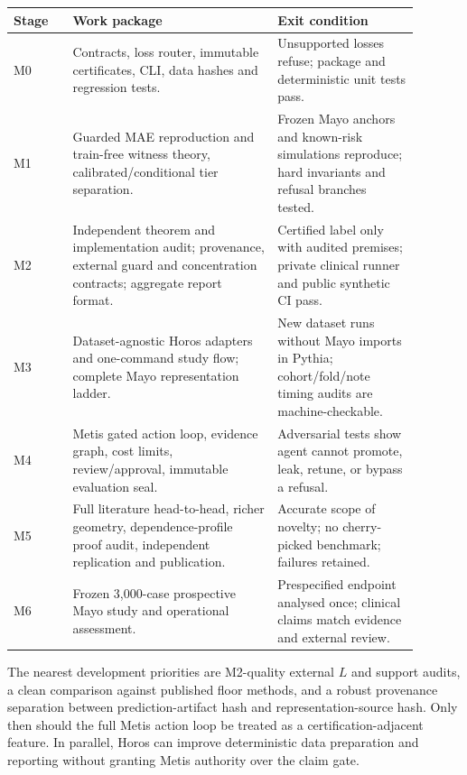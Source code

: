 \documentclass[11pt]{article}
\begin{document}
\begin{longtable}{p{0.13\linewidth}p{0.45\linewidth}p{0.31\linewidth}}
\toprule
Stage & Work package & Exit condition\\\midrule\endhead
M0 & Contracts, loss router, immutable certificates, CLI, data hashes and regression tests. & Unsupported losses refuse; package and deterministic unit tests pass.\\
M1 & Guarded MAE reproduction and train-free witness theory, calibrated/conditional tier separation. & Frozen Mayo anchors and known-risk simulations reproduce; hard invariants and refusal branches tested.\\
M2 & Independent theorem and implementation audit; provenance, external guard and concentration contracts; aggregate report format. & Certified label only with audited premises; private clinical runner and public synthetic CI pass.\\
M3 & Dataset-agnostic Horos adapters and one-command study flow; complete Mayo representation ladder. & New dataset runs without Mayo imports in Pythia; cohort/fold/note timing audits are machine-checkable.\\
M4 & Metis gated action loop, evidence graph, cost limits, review/approval, immutable evaluation seal. & Adversarial tests show agent cannot promote, leak, retune, or bypass a refusal.\\
M5 & Full literature head-to-head, richer geometry, dependence-profile proof audit, independent replication and publication. & Accurate scope of novelty; no cherry-picked benchmark; failures retained.\\
M6 & Frozen 3,000-case prospective Mayo study and operational assessment. & Prespecified endpoint analysed once; clinical claims match evidence and external review.\\
\bottomrule\end{longtable}

The nearest development priorities are M2-quality external $L$ and support audits, a clean comparison against published floor methods, and a robust provenance separation between prediction-artifact hash and representation-source hash. Only then should the full Metis action loop be treated as a certification-adjacent feature. In parallel, Horos can improve deterministic data preparation and reporting without granting Metis authority over the claim gate.
\end{document}
